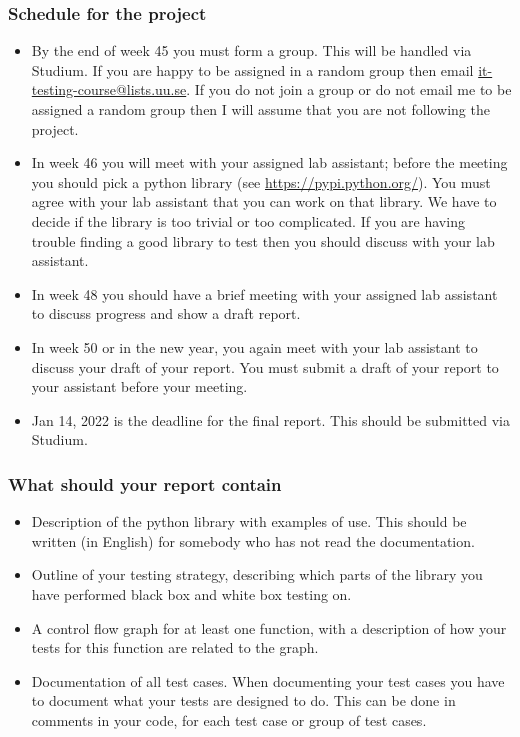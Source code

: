 \documentclass[a4paper]{article}
\begin{document}
\subsubsection*{Schedule for the project}
\begin{itemize}
\item By the end of  week 45 you must form a
    group. This will be handled via Studium.  If you are happy to be
    assigned in a random group then email
    \url{it-testing-course@lists.uu.se}. If you do not  join a group
    or do not email me to be assigned a random group then I will
    assume that you are not following the project. 
  \item In week 46 you will meet with  your assigned lab assistant; before
    the meeting you should pick a python library (see 
    \url{https://pypi.python.org/}). You must agree with your lab
    assistant that you can work on that library. We have to decide if
    the library is too trivial or too complicated. If you are having
    trouble finding a good library to test then you should discuss
    with your lab assistant. 
  \item In week  48 you should have a brief meeting with your assigned lab
    assistant to discuss progress and show a draft report. 

  \item In week 50 or in the new year, you again meet with your
    lab assistant to discuss your draft of your report. You must
    submit a draft of your report to your assistant before your
    meeting.
    \item Jan 14,  2022 is  the deadline for the final
      report. This should be submitted via Studium. 

\end{itemize}



  \subsubsection*{What should your report contain}
  \begin{itemize}
  \item Description of the python library with examples of use.  This
    should be written (in English) for somebody who has not read the
    documentation.
  \item Outline of your testing strategy, describing which parts of the library 
    you have performed black box and white box testing on.
  \item A control flow graph for at least one function, with a description of 
    how your tests for this function are related to the graph.
  \item Documentation of all test cases.  When documenting your test cases
    you have to document what your tests are designed to do. This can be done
    in comments in your code, for each test case or group of test cases.
  \end{itemize}
\end{document}
